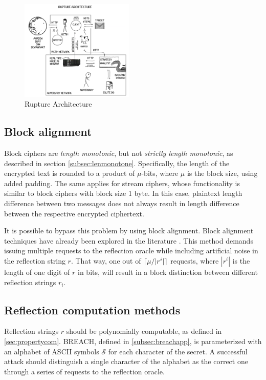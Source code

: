 \documentclass[conference, letterpaper, 10pt]{IEEEtran}
\DeclarePairedDelimiter{\ceil}{\lceil}{\rceil}
\begin{document}
   \begin{figure}[thpb]
      \centering
      \includegraphics[width=0.48\textwidth]{architecture.png}
      \caption{Rupture Architecture}
   \end{figure}

\subsection{Block alignment}\label{subsec:blockalign}
Block ciphers are \textit{length monotonic}, but not \textit{strictly length
monotonic}, as described in section \ref{subsec:lenmonotone}. Specifically, the
length of the encrypted text is rounded to a product of $\mu$-bits, where $\mu$
is the block size, using added padding. The same applies for stream ciphers,
whose functionality is similar to block ciphers with block size 1 byte. In this
case, plaintext length difference between two messages does not always result in
length difference between the respective encrypted ciphertext.

It is possible to bypass this problem by using block alignment. Block alignment
techniques have already been explored in the literature \cite{c14}.  This method
demands issuing multiple requests to the reflection oracle while including
artificial noise in the reflection string $r$.  That way, one out of
$\ceil{\mu / |r^i|}$ requests, where $|r^i|$ is the length of one digit of
$r$ in bits, will result in a block distinction between different reflection
strings $r_i$.

\subsection{Reflection computation methods}\label{subsec:reflectionmethods}
Reflection strings $r$ should be polynomially computable, as defined in
\ref{sec:propertycom}. BREACH, defined in \ref{subsec:breachapp}, is
parameterized with an alphabet of ASCII symbols $\mathcal{S}$ for each character of the
secret. A successful attack should distinguish a single character of the
alphabet as the correct one through a series of requests to the reflection
oracle.
\end{document}

